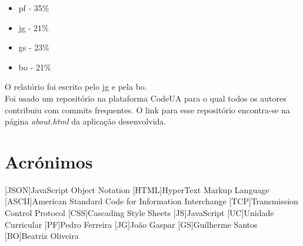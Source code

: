 \documentclass[a4paper, 11pt, oneside]{report}
\begin{document}
\begin{itemize}
\item \acs{pf} - 35\%
\item \acs{jg} - 21\%
\item \acs{gs} - 23\%
\item \acs{bo} - 21\%
\end{itemize}

\indent O relatório foi escrito pelo \acs{jg} e pela \acs{bo}.\\
\indent Foi usado um repositório na plataforma CodeUA para o qual todos os autores
contribuiu com commits frequentes. O link para esse repositório encontra-se
na página \textit{about.html} da aplicação desenvolvida.

\chapter*{Acrónimos}
\begin{acronym}
[JSON]{JavaScript Object Notation}
[HTML]{HyperText Markup Language}
[ASCII]{American Standard Code for Information Interchange}
[TCP]{Transmission Control Protocol}
[CSS]{Cascading Style Sheets}
[JS]{JavaScript}
[UC]{Unidade Curricular}
[PF]{Pedro Ferreira}
[JG]{João Gaspar}
[GS]{Guilherme Santos}
[BO]{Beatriz Oliveira}
\end{acronym}
\end{document}
